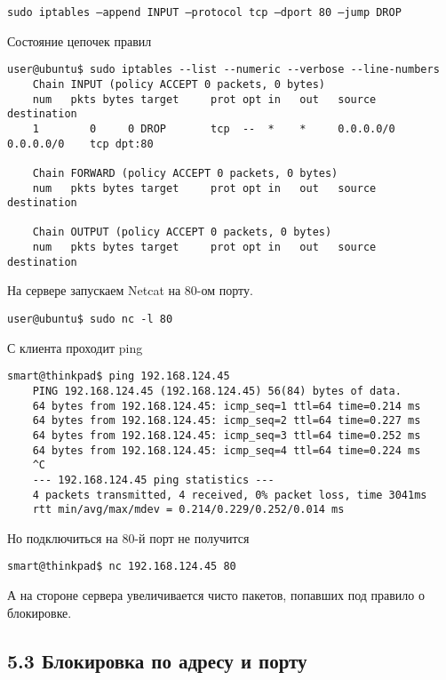 \texttt{sudo iptables --append INPUT --protocol tcp --dport 80 --jump DROP}

Состояние цепочек правил
\begin{Verbatim}[frame=single]
    user@ubuntu$ sudo iptables --list --numeric --verbose --line-numbers
    Chain INPUT (policy ACCEPT 0 packets, 0 bytes)
    num   pkts bytes target     prot opt in   out   source      destination
    1        0     0 DROP       tcp  --  *    *     0.0.0.0/0   0.0.0.0/0    tcp dpt:80
    
    Chain FORWARD (policy ACCEPT 0 packets, 0 bytes)
    num   pkts bytes target     prot opt in   out   source      destination
    
    Chain OUTPUT (policy ACCEPT 0 packets, 0 bytes)
    num   pkts bytes target     prot opt in   out   source      destination
\end{Verbatim}

На сервере запускаем Netcat на 80-ом порту.
\begin{Verbatim}[frame=single]
    user@ubuntu$ sudo nc -l 80
\end{Verbatim}

С клиента проходит ping
\begin{Verbatim}[frame=single]
    smart@thinkpad$ ping 192.168.124.45
    PING 192.168.124.45 (192.168.124.45) 56(84) bytes of data.
    64 bytes from 192.168.124.45: icmp_seq=1 ttl=64 time=0.214 ms
    64 bytes from 192.168.124.45: icmp_seq=2 ttl=64 time=0.227 ms
    64 bytes from 192.168.124.45: icmp_seq=3 ttl=64 time=0.252 ms
    64 bytes from 192.168.124.45: icmp_seq=4 ttl=64 time=0.224 ms
    ^C
    --- 192.168.124.45 ping statistics ---
    4 packets transmitted, 4 received, 0% packet loss, time 3041ms
    rtt min/avg/max/mdev = 0.214/0.229/0.252/0.014 ms
\end{Verbatim}

Но подключиться на 80-й порт не получится
\begin{Verbatim}[frame=single]
    smart@thinkpad$ nc 192.168.124.45 80
\end{Verbatim}

А на стороне сервера увеличивается чисто пакетов, попавших под правило о блокировке.

\subsection*{5.3 Блокировка по адресу и порту}

